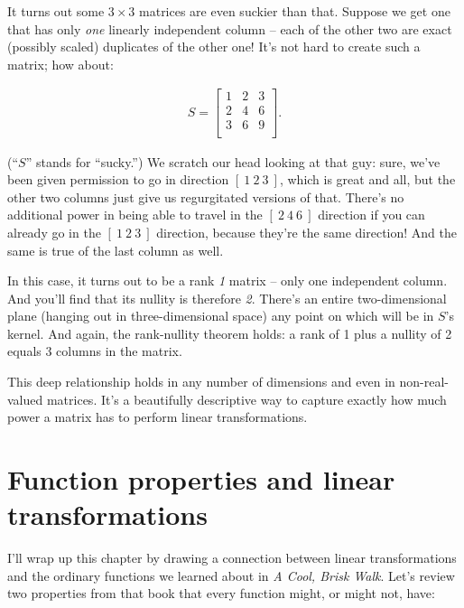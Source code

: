 It turns out some $3\times 3$ matrices are even suckier than that. Suppose we
get one that has only \textit{one} linearly independent column -- each of the
other two are exact (possibly scaled) duplicates of the other one! It's not
hard to create such a matrix; how about:

\vspace{-.15in}
\begin{align*}
S =
\begin{bmatrix}
1 & 2 & 3 \\
2 & 4 & 6 \\
3 & 6 & 9 \\
\end{bmatrix}.
\end{align*}
\vspace{-.15in}


(``$S$'' stands for ``sucky.'') We scratch our head looking at that guy: sure,
we've been given permission to go in direction $[\ 1\ 2\ 3\ ]$, which is great
and all, but the other two columns just give us regurgitated versions of that.
There's no additional power in being able to travel in the $[\ 2\ 4\ 6\ ]$
direction if you can already go in the $[\ 1\ 2\ 3\ ]$ direction, because
they're the same direction! And the same is true of the last column as well.

In this case, it turns out to be a rank \textit{1} matrix -- only one
independent column. And you'll find that its nullity is therefore \textit{2}.
There's an entire two-dimensional plane (hanging out in three-dimensional space)
any point on which will be in $S$'s kernel. And again, the rank-nullity theorem
holds: a rank of 1 plus a nullity of 2 equals 3 columns in the matrix.

This deep relationship holds in any number of dimensions and even in
non-real-valued matrices. It's a beautifully descriptive way to capture exactly
how much power a matrix has to perform linear transformations.

\section[Function properties]{\large Function properties and linear transformations}

\label{sec:functionProps}

I'll wrap up this chapter by drawing a connection between linear
transformations and the ordinary functions we learned about in \textit{A Cool,
Brisk Walk}. Let's review two properties from that book that every function
might, or might not, have:

